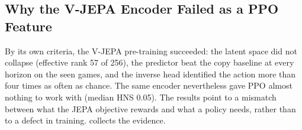 \documentclass[runningheads]{llncs}
\begin{document}
\subsection{Why the V-JEPA Encoder Failed as a PPO Feature}
\label{sec:jepa-fail}

By its own criteria, the V-JEPA pre-training succeeded: the latent space did not collapse
(effective rank 57 of 256), the predictor beat the copy baseline at every horizon on the
seen games, and the inverse head identified the action more than four times as often as chance.
The same encoder nevertheless gave PPO almost nothing to work with (median HNS 0.05). The
results point to a mismatch between what the JEPA objective rewards and what a policy
needs, rather than to a defect in training.  collects the evidence.
\end{document}
